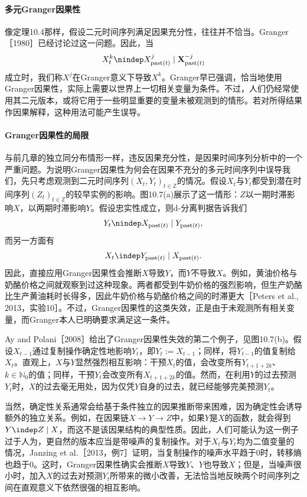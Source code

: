 \paragraph*{多元Granger因果性}
像定理10.4那样，假设二元时间序列满足因果充分性，往往并不恰当。Granger［1980］已经讨论过这一问题。因此，当
\[
 X_t^k\nindep X_{\mathrm{past}(t)}^j\mid\mathbf X_{\mathrm{past}(t)}^{-j}
\]
成立时，我们称$X^j$在Granger意义下导致$X^k$。Granger早已强调，恰当地使用Granger因果性，实际上需要以世界上一切相关变量为条件。不过，人们仍经常使用其二元版本，或将它用于一些明显重要的变量未被观测到的情形。若对所得结果作因果解释，这种用法可能产生误导。

\paragraph*{Granger因果性的局限}
与前几章的独立同分布情形一样，违反因果充分性，是因果时间序列分析中的一个严重问题。为说明Granger因果性为何会在因果不充分的多元时间序列中误导我们，先只考虑观测到二元时间序列$(X_t,Y_t)_{t\in\mathbb Z}$的情况。假设$X_t$与$Y_t$都受到潜在时间序列$(Z_t)_{t\in\mathbb Z}$的较早实例的影响。图10.7(a)展示了这一情形：$Z$以一期时滞影响$X$，以两期时滞影响$Y$。假设忠实性成立，则d-分离判据告诉我们
\[
 Y_t\nindep X_{\mathrm{past}(t)}\mid Y_{\mathrm{past}(t)},
\]
而另一方面有
\[
 X_t\indep Y_{\mathrm{past}(t)}\mid X_{\mathrm{past}(t)}.
\]
因此，直接应用Granger因果性会推断$X$导致$Y$，而$Y$不导致$X$。例如，黄油价格与奶酪价格之间就观察到过这种现象。两者都受到牛奶价格的强烈影响，但生产奶酪比生产黄油耗时长得多，因此牛奶价格与奶酪价格之间的时滞更大［Peters et al., 2013，实验10］。不过，Granger因果性的这类失效，正是由于未观测所有相关变量，而Granger本人已明确要求满足这一条件。


Ay and Polani［2008］给出了Granger因果性失效的第二个例子，见图10.7(b)。假设$X_{t-1}$通过复制操作确定性地影响$Y_t$，即$Y_t:=X_{t-1}$；同样，将$Y_{t-1}$的值复制给$X_t$。直观上，$X$与$Y$显然强烈相互影响：干预$X_t$的值，会改变所有$Y_{t+1+2k}$、$k\in\mathbb N_0$的值；同样，干预$Y_t$会改变所有$X_{t+1+2k}$的值。然而，在利用$Y$的过去预测$Y_t$时，$X$的过去毫无用处，因为仅凭$Y$自身的过去，就已经能够完美预测$Y_t$。

当然，确定性关系通常会给基于条件独立的因果推断带来困难，因为确定性会诱导额外的独立关系。例如，在因果链$X\to Y\to Z$中，如果$Y$是$X$的函数，就会得到$Y\indep Z\mid X$，而这不是该因果结构的典型性质。因此，人们可能认为这一例子过于人为，更自然的版本应当是带噪声的复制操作。对于$X_t$与$Y_t$均为二值变量的情况，Janzing et al.［2013，例7］证明，当复制操作的噪声水平趋于$0$时，转移熵也趋于$0$。这时，Granger因果性确实会推断$X$导致$Y$、$Y$也导致$X$；但是，当噪声很小时，加入$X$的过去对预测$Y_t$所带来的微小改善，无法恰当地反映两个时间序列之间在直观意义下依然很强的相互影响。

